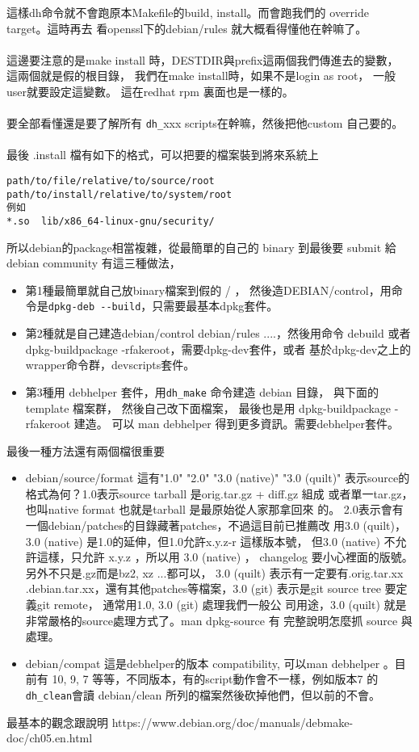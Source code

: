   這樣dh命令就不會跑原本Makefile的build, install。而會跑我們的
  override target。這時再去
  看openssl下的debian/rules 就大概看得懂他在幹嘛了。
  \\\\
  這邊要注意的是make install 時，DESTDIR與prefix這兩個我們傳進去的變數，
  這兩個就是假的根目錄， 我們在make install時，如果不是login as root，
  一般user就要設定這變數。 這在redhat rpm 裏面也是一樣的。
  \\\\
  要全部看懂還是要了解所有
  \verb=dh_=xxx scripts在幹嘛，然後把他custom 自己要的。
  \\\\
  最後 .install 檔有如下的格式，可以把要的檔案裝到將來系統上
  \begin{verbatim}
path/to/file/relative/to/source/root path/to/install/relative/to/system/root
例如
*.so  lib/x86_64-linux-gnu/security/
  \end{verbatim}
  所以debian的package相當複雜，從最簡單的自己的 binary 到最後要 submit 給
  debian community 有這三種做法，
  \begin{itemize}
    \item 第1種最簡單就自己放binary檔案到假的 / ， 然後造DEBIAN/control，用命
      令是\verb=dpkg-deb --build=，只需要最基本dpkg套件。
    \item 第2種就是自己建造debian/control debian/rules ....，然後用命令
      debuild 或者 dpkg-buildpackage -rfakeroot，需要dpkg-dev套件，或者
      基於dpkg-dev之上的wrapper命令群，devscripts套件。
    \item 第3種用 debhelper 套件，用\verb=dh_make= 命令建造 debian 目錄，
      與下面的 template 檔案群， 然後自己改下面檔案， 最後也是用
      dpkg-buildpackage -rfakeroot 建造。
      可以 man debhelper 得到更多資訊。需要debhelper套件。
  \end{itemize}
  最後一種方法還有兩個檔很重要
  \begin{itemize}
    \item debian/source/format 這有"1.0" "2.0" "3.0 (native)" "3.0 (quilt)"
      表示source的格式為何？1.0表示source tarball 是orig.tar.gz + diff.gz 組成
      或者單一tar.gz，也叫native format 也就是tarball 是最原始從人家那拿回來
      的。 2.0表示會有一個debian/patches的目錄藏著patches，不過這目前已推薦改
      用3.0 (quilt)，3.0 (native) 是1.0的延伸，但1.0允許x.y.z-r 這樣版本號，
      但3.0 (native) 不允許這樣，只允許 x.y.z ，所以用 3.0 (native) ，
      changelog 要小心裡面的版號。另外不只是.gz而是bz2, xz ...都可以，
      3.0 (quilt) 表示有一定要有.orig.tar.xx
      .debian.tar.xx，還有其他patches等檔案，3.0 (git) 表示是git source tree
      要定義git remote， 通常用1.0, 3.0 (git) 處理我們一般公
      司用途，3.0 (quilt) 就是非常嚴格的source處理方式了。man dpkg-source 有
      完整說明怎麼抓 source 與處理。
    \item debian/compat 這是debhelper的版本 compatibility, 可以man debhelper
      。目前有 10, 9, 7 等等，不同版本，有的script動作會不一樣，例如版本7 的
      \verb=dh_clean=會讀 debian/clean 所列的檔案然後砍掉他們，但以前的不會。
  \end{itemize}
  最基本的觀念跟說明
  https://www.debian.org/doc/manuals/debmake-doc/ch05.en.html

